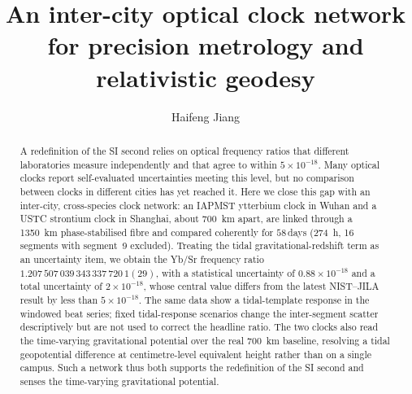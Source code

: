 \documentclass[11pt,a4paper]{article}
\title{An inter-city optical clock network for precision metrology
and relativistic geodesy}
\author{%
  Haifeng Jiang%
}
\date{}
\begin{document}
\maketitle

\begin{abstract}
\sloppy
A redefinition of the SI second relies on optical frequency ratios that
different laboratories measure independently and that agree to within
$5\times10^{-18}$. Many optical clocks report self-evaluated uncertainties
meeting this level, but no comparison between clocks in different cities
has yet reached it. Here we close this gap with an inter-city,
cross-species clock network: an IAPMST ytterbium clock in Wuhan and a USTC
strontium clock in Shanghai, about \qty{700}{km} apart, are linked through a
\qty{1350}{km} phase-stabilised fibre and compared coherently for $58$\,days
(\qty{274}{h}, 16 segments with segment~9 excluded). Treating the tidal
gravitational-redshift term as an
uncertainty item, we obtain the Yb/Sr frequency ratio
$1.207\,507\,039\,343\,337\,720\,1(29)$, with a statistical uncertainty of
$0.88\times10^{-18}$ and a total uncertainty of $2\times10^{-18}$, whose
central value differs from the latest NIST--JILA result by less than
$5\times10^{-18}$. The same data show a tidal-template response in the
windowed beat series; fixed tidal-response scenarios change the
inter-segment scatter descriptively but are not used to correct the headline
ratio. The two clocks also read the time-varying
gravitational potential over the real \qty{700}{km} baseline, resolving a
tidal geopotential difference at centimetre-level equivalent height rather
than on a single campus. Such a network thus both supports the redefinition
of the SI second and senses the time-varying gravitational potential.

\end{abstract}
\end{document}
